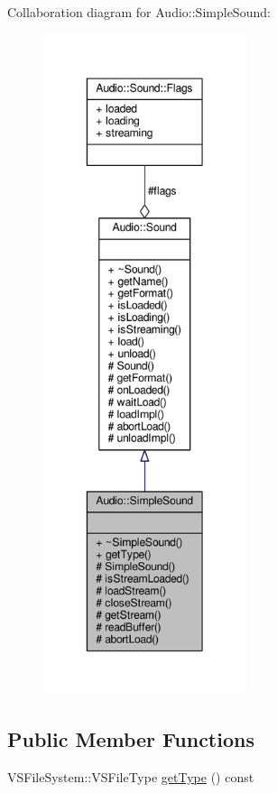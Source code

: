 Collaboration diagram for Audio\+:\+:Simple\+Sound\+:
\nopagebreak
\begin{figure}[H]
\begin{center}
\leavevmode
\includegraphics[height=550pt]{d2/d40/classAudio_1_1SimpleSound__coll__graph}
\end{center}
\end{figure}
\subsection*{Public Member Functions}
\begin{DoxyCompactItemize}
\item 
V\+S\+File\+System\+::\+V\+S\+File\+Type \hyperlink{classAudio_1_1SimpleSound_a6d9df2525400aee9b21eebdbe4392d52}{get\+Type} () const 
\end{DoxyCompactItemize}
